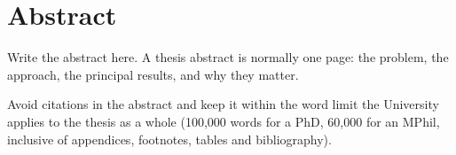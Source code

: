 \chapter*{Abstract}

Write the abstract here. A thesis abstract is normally one page: the
problem, the approach, the principal results, and why they matter.

Avoid citations in the abstract and keep it within the word limit the
University applies to the thesis as a whole (100,000 words for a PhD,
60,000 for an MPhil, inclusive of appendices, footnotes, tables and
bibliography).
